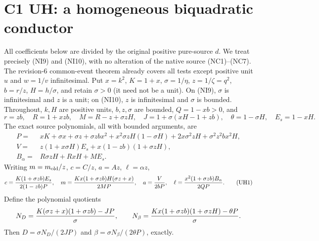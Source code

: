 \section{\texorpdfstring{C1 UH: a homogeneous biquadratic conductor}{C1 UH: a homogeneous biquadratic conductor}}
\label{component:pf7ffa921793c}

\label{pf7ffa921793c:sec:r7-c1-uh}
All coefficients below are divided by the original positive pure-source
$d$. We treat precisely (NI9) and (NI10), with no alteration of the native
source (NC1)--(NC7). The revision-6 common-event theorem already covers
all tests except positive unit $u$ and $w=1/v$ infinitesimal.
Put $x=k^2$, $K=1+x$, $\sigma=1/\eta$, $z=1/\zeta=q^2$,
$b=r/z$, $H=h/\sigma$, and retain $\sigma>0$ (it need not be a unit).
On (NI9), $\sigma$ is infinitesimal and $z$ is a unit; on (NI10),
$z$ is infinitesimal and $\sigma$ is bounded. Throughout, $k,H$ are
positive units, $b,z,\sigma$ are bounded, $Q=1-xb>0$, and
\[
 r=zb,\quad R=1+xzb,\quad M=R-z+\sigma zH,
 \quad J=1+\sigma(xH-1+zb),\quad\theta=1-\sigma H,
 \quad E_s=1-xH.
\]
The exact source polynomials, all with bounded arguments, are
\begin{align*}
 P={}&xK+\sigma x+\sigma z+\sigma zb x^2
 +x^2\sigma zH(1-\sigma H)+2x\sigma^2zH
 +\sigma^2z^2bx^2H,\\
 V={}&z(1+x\sigma H)E_s+x(1-zb)(1+\sigma zH),\\
 B_\alpha={}&R\sigma zH+RxH+ME_s.
\end{align*}
Writing $m=m_{\rm old}/z$, $c=C/z$, $a=Az$, $\ell=\alpha z$,
\[
 c={K(1+\sigma zb)E_s\over2(1-zb)P},\quad
 m={Kx(1+\sigma zb)H(\sigma z+x)\over2MP},\quad
 a={V\over2bP},\quad
 \ell={x^2(1+\sigma zb)B_\alpha\over2QP}.                 \tag{UH1}
\]
Define the polynomial quotients
\[
 N_D={K(\sigma z+x)(1+\sigma zb)-JP\over\sigma},\qquad
 N_\beta={Kx(1+\sigma zb)(1+\sigma zH)-\theta P\over\sigma}.
\]
Then $D=\sigma N_D/(2JP)$ and
$\beta=\sigma N_\beta/(2\theta P)$, exactly.


